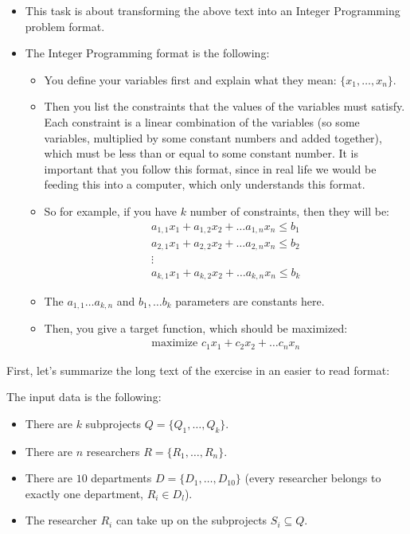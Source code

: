 \begin{itemize}
    \item This task is about transforming the above text into an Integer Programming problem format.
    \item The Integer Programming format is the following:
    \begin{itemize}
        \item You define your variables first and explain what they mean: $\{x_1,\dots{},x_n\}$.
        \item Then you list the constraints that the values of the variables must satisfy. Each constraint is a linear combination of the variables (so some variables, multiplied by some constant numbers and added together), which must be less than or equal to some constant number. It is important that you follow this format, since in real life we would be feeding this into a computer, which only understands this format.
        \item So for example, if you have $k$ number of constraints, then they will be:
        \begin{align*}
            a_{1,1}x_1 + a_{1,2}x_2 + \dots{} a_{1,n}x_n \leq{} b_1\\
            a_{2,1}x_1 + a_{2,2}x_2 + \dots{} a_{2,n}x_n \leq{} b_2\\
            \vdots{}\\
            a_{k,1}x_1 + a_{k,2}x_2 + \dots{} a_{k,n}x_n \leq{} b_k
        \end{align*}
        \item The $a_{1,1}\dots{}a_{k,n}$ and $b_1,\dots{}b_k$ parameters are constants here.
        \item Then, you give a target function, which should be maximized:
        \begin{align*}
            \text{maximize } c_{1}x_1 + c_{2}x_2 + \dots{} c_{n}x_n
        \end{align*}
    \end{itemize}
\end{itemize}

First, let's summarize the long text of the exercise in an easier to read format:

The input data is the following:
\begin{itemize}
    \item There are $k$ subprojects $Q = \{Q_1, \dots{}, Q_k\}$.
    \item There are $n$ researchers $R = \{R_1, \dots{}, R_n\}$.
    \item There are $10$ departments $D = \{D_1, \dots{}, D_{10}\}$ (every researcher belongs to exactly one department, $R_i\in{}D_l$).
    \item The researcher $R_i$ can take up on the subprojects $S_i\subseteq{}Q$.
\end{itemize}

